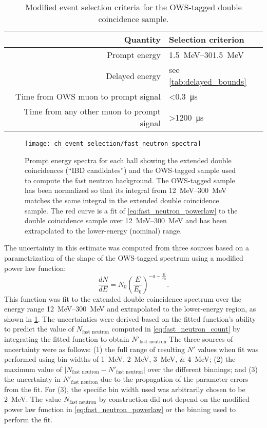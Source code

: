 \begin{table}
    \centering
    \caption[OWS tag criteria]{
        Modified event selection criteria for the OWS-tagged
        double coincidence sample.
    }
    \label{tab:fast_neutron}
    \begin{tabular}[t]{rl}
        \toprule
        Quantity & Selection criterion \\
        \midrule
        Prompt energy & \SIrange{1.5}{301.5}{\MeV} \\
        Delayed energy & see \cref{tab:delayed_bounds} \\
        Time from OWS muon to prompt signal & \SI{<0.3}{\us} \\
        Time from any other muon to prompt signal & \SI{>1200}{\us} \\
        \bottomrule
    \end{tabular}
\end{table}

\begin{figure}
    \centering
    \texttt{[image: ch\_event\_selection/fast\_neutron\_spectra]}
    \caption[Fast neutron spectrum]{
        Prompt energy spectra for each hall
        showing the extended double coincidences (``IBD candidates'')
        and the OWS-tagged sample used to compute the fast neutron background.
        The OWS-tagged sample has been normalized
        so that its integral from \SIrange{12}{300}{\MeV}
        matches the same integral in the extended double coincidence sample.
        The red curve is a fit of \cref{eq:fast_neutron_powerlaw}
        to the double coincidence sample over \SIrange{12}{300}{\MeV}
        and has been extrapolated to the lower-energy (nominal) range.
    }
    \label{fig:fast_neutron}
\end{figure}

The uncertainty in this estimate was computed from three sources
based on a parametri\-zation of the shape of the OWS-tagged spectrum
using a modified power law function:
\begin{equation}\label{eq:fast_neutron_powerlaw}
    \frac{dN}{dE} = N_0 \left(\frac{E}{E_0}\right)^{-a-\frac{E}{E_0}}.
\end{equation}
This function was fit to the extended double coincidence spectrum
over the energy range \SIrange{12}{300}{\MeV}
and extrapolated to the lower-energy region,
as shown in \cref{fig:fast_neutron}.
The uncertainties were derived based on the fitted function's
ability to predict the value of $N_{\text{fast neutron}}$
computed in \cref{eq:fast_neutron_count}
by integrating the fitted function to obtain $N'_\text{fast neutron}$
The three sources of uncertainty were as follows:
(1) the full range of resulting $N'$ values
when fit was performed using bin widths of \SIlist{1;2;3;4}{\MeV};
(2) the maximum value of $\vert N_\text{fast neutron} - N'_\text{fast neutron}\vert$
over the different binnings;
and (3) the uncertainty in $N'_\text{fast neutron}$ due to
the propagation of the parameter errors from the fit.
For (3), the specific bin width used was arbitrarily chosen to be \SI{2}{\MeV}.
The value $N_\text{fast neutron}$ by construction did not depend
on the modified power law function in \cref{eq:fast_neutron_powerlaw}
or the binning used to perform the fit.

